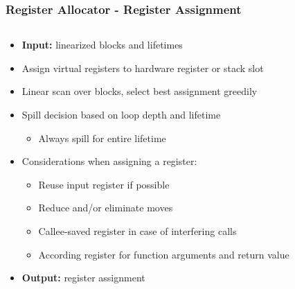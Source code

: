\documentclass[navbaroff,en]{sdqbeamer}
\begin{document}
\begin{frame}
\frametitle{Register Allocator - Register Assignment}

\begin{columns}
	\begin{column}{0.7\textwidth}
		\begin{itemize}
			\item \textbf{Input:} linearized blocks and lifetimes
			\item Assign virtual registers to hardware register or stack slot
			\item Linear scan over blocks, select best assignment greedily
			\item Spill decision based on loop depth and lifetime 
			\begin{itemize}
				\item Always spill for entire lifetime
			\end{itemize}
			\item Considerations when assigning a register:
			\begin{itemize}
				\item Reuse input register if possible
				\item Reduce and/or eliminate moves
				\item Callee-saved register in case of interfering calls
				\item According register for function arguments and return value
			\end{itemize}
			\item \textbf{Output:} register assignment
		\end{itemize}
	\end{column}
	

\end{columns}
\end{frame}
\end{document}
